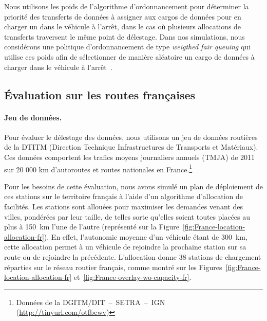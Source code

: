  
Nous utilisons les poids de l’algorithme d’ordonnancement pour déterminer la priorité des transferts de données à assigner aux cargos de données pour en charger un dans le véhicule à l’arrêt, dans le cas où plusieurs allocations de transferts traversent le même point de délestage. Dans nos simulations, nous considérons une politique d’ordonnancement de type \textit{weigthed fair queuing} qui utilise ces poids afin de sélectionner de manière aléatoire un cargo de données à charger dans le véhicule à l’arrêt~\cite{shreedhar1996efficient}. 
 
 
 
 
\subsection{Évaluation sur les routes françaises} 
\label{sec:evaluation-fr} 
 
 
\paragraph{Jeu de données.} 
Pour évaluer le délestage des données, nous utilisons un jeu de données routières de la DTITM (Direction Technique Infrastructures de Transports et Matériaux). Ces données comportent les trafics moyens journaliers annuels (TMJA) de 2011 sur 20 000 km d’autoroutes et routes nationales en France.\footnote{Données de la DGITM/DIT~--~SETRA~--~IGN (\url{http://tinyurl.com/otfbewv})} 
 
 
Pour les besoins de cette évaluation, nous avons simulé un plan de déploiement de ces stations sur le territoire français à l’aide d’un algorithme d’allocation de facilités. Les stations sont allouées pour maximiser les demandes venant des villes, pondérées par leur taille, de telles sorte qu’elles soient toutes placées au plus à 150~km l’une de l’autre (représenté sur la Figure~\ref{fig:France-location-allocation-fr}). En effet, l’autonomie moyenne d’un véhicule étant de 300~km, cette allocation permet à un véhicule de rejoindre la prochaine station sur sa route ou de rejoindre la précédente. L’allocation donne 38 stations de chargement réparties sur le réseau routier français, comme montré sur les Figures~\ref{fig:France-location-allocation-fr} et~\ref{fig:France-overlay-wo-capacity-fr}.  
 

